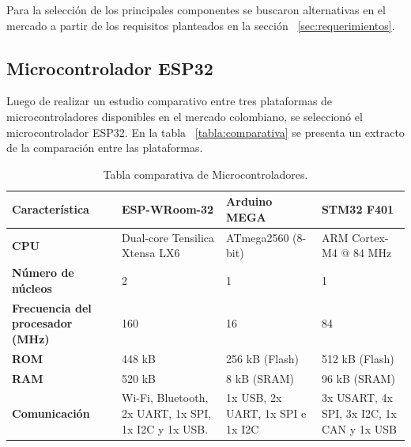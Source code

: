 Para la selección de los principales componentes se buscaron alternativas en el mercado a partir de los requisitos planteados en la sección ~\ref{sec:requerimientos}.

\subsection{Microcontrolador ESP32}
\label{Microcontrolador}

Luego de realizar un estudio comparativo entre tres plataformas de microcontroladores disponibles en el mercado colombiano, se seleccionó el microcontrolador ESP32. En la tabla ~\ref{tabla:comparativa} se presenta un extracto de la comparación entre las plataformas. 

\begin{table}[h]
    \centering
    \caption{Tabla comparativa de Microcontroladores.}
    \begin{tabular}{p{3cm} p{3cm} p{2.5cm} p{2.5cm} }
    \toprule

        \textbf{Característica}           & \textbf{ESP-WRoom-32}               & \textbf{Arduino MEGA}               & \textbf{STM32 F401} \\
        \midrule
        \textbf{CPU}                    & Dual-core Tensilica Xtensa LX6     & ATmega2560 (8-bit)                  & ARM Cortex-M4 @ 84 MHz               \\
        
        \textbf{Número de núcleos}       & 2                                  & 1                                  & 1                                   \\
        
        \textbf{Frecuencia del procesador (MHz)}  & 160                       & 16                                 & 84                                  \\

        \textbf{ROM}             & 448 kB                             & 256 kB (Flash)                     & 512 kB (Flash)                      \\

        \textbf{RAM}             & 520 kB                             & 8 kB (SRAM)                        & 96 kB (SRAM)                        \\

        \textbf{Comunicación} & Wi-Fi, Bluetooth, 2x UART, 1x SPI, 1x I2C y 1x USB.    & 1x USB, 2x UART, 1x SPI e 1x I2C                 & 3x USART, 4x SPI, 3x I2C, 1x CAN y 1x USB  \\


\end{tabular}
\end{table}

